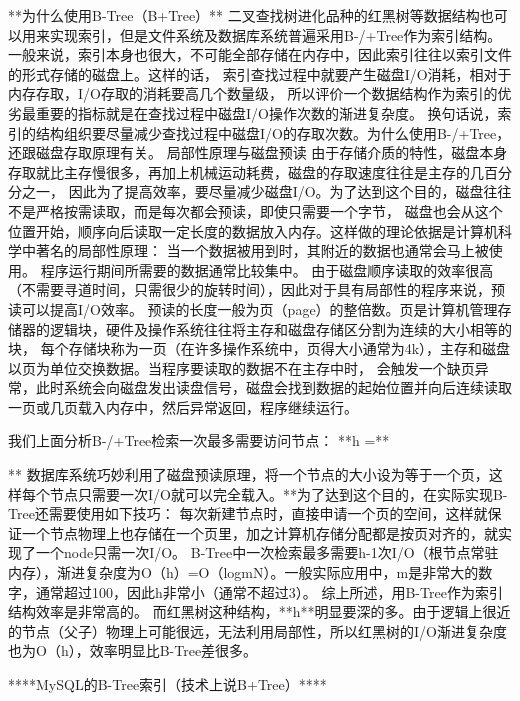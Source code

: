 \documentclass{book}
\begin{document}
**为什么使用B-Tree（B+Tree）**
二叉查找树进化品种的红黑树等数据结构也可以用来实现索引，但是文件系统及数据库系统普遍采用B-/+Tree作为索引结构。
一般来说，索引本身也很大，不可能全部存储在内存中，因此索引往往以索引文件的形式存储的磁盘上。这样的话，
索引查找过程中就要产生磁盘I/O消耗，相对于内存存取，I/O存取的消耗要高几个数量级，
所以评价一个数据结构作为索引的优劣最重要的指标就是在查找过程中磁盘I/O操作次数的渐进复杂度。
换句话说，索引的结构组织要尽量减少查找过程中磁盘I/O的存取次数。为什么使用B-/+Tree，还跟磁盘存取原理有关。
局部性原理与磁盘预读
由于存储介质的特性，磁盘本身存取就比主存慢很多，再加上机械运动耗费，磁盘的存取速度往往是主存的几百分分之一，
因此为了提高效率，要尽量减少磁盘I/O。为了达到这个目的，磁盘往往不是严格按需读取，而是每次都会预读，即使只需要一个字节，
磁盘也会从这个位置开始，顺序向后读取一定长度的数据放入内存。这样做的理论依据是计算机科学中著名的局部性原理：
当一个数据被用到时，其附近的数据也通常会马上被使用。
程序运行期间所需要的数据通常比较集中。
由于磁盘顺序读取的效率很高（不需要寻道时间，只需很少的旋转时间），因此对于具有局部性的程序来说，预读可以提高I/O效率。
预读的长度一般为页（page）的整倍数。页是计算机管理存储器的逻辑块，硬件及操作系统往往将主存和磁盘存储区分割为连续的大小相等的块，
每个存储块称为一页（在许多操作系统中，页得大小通常为4k），主存和磁盘以页为单位交换数据。当程序要读取的数据不在主存中时，
会触发一个缺页异常，此时系统会向磁盘发出读盘信号，磁盘会找到数据的起始位置并向后连续读取一页或几页载入内存中，然后异常返回，程序继续运行。

我们上面分析B-/+Tree检索一次最多需要访问节点：
**h =**

** 数据库系统巧妙利用了磁盘预读原理，将一个节点的大小设为等于一个页，这样每个节点只需要一次I/O就可以完全载入。**为了达到这个目的，在实际实现B- Tree还需要使用如下技巧：
每次新建节点时，直接申请一个页的空间，这样就保证一个节点物理上也存储在一个页里，加之计算机存储分配都是按页对齐的，就实现了一个node只需一次I/O。
B-Tree中一次检索最多需要h-1次I/O（根节点常驻内存），渐进复杂度为O（h）=O（logmN）。一般实际应用中，m是非常大的数字，通常超过100，因此h非常小（通常不超过3）。
综上所述，用B-Tree作为索引结构效率是非常高的。
而红黑树这种结构，**h**明显要深的多。由于逻辑上很近的节点（父子）物理上可能很远，无法利用局部性，所以红黑树的I/O渐进复杂度也为O（h），效率明显比B-Tree差很多。




****MySQL的B-Tree索引（技术上说B+Tree）****
\end{document}
